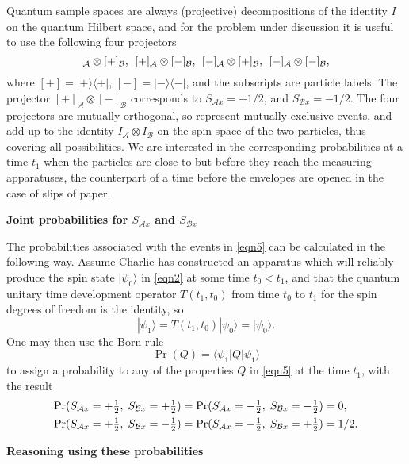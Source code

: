 \documentclass[10pt]{article} %
\def\outl#1{\par{\medskip\noindent\hspace*{.5cm}\bf
      \mathversion{bold}#1\mathversion{normal}\smallskip} }
\def\np{} \def\xa{} \def\xb{} \def\xn{} \def\xp{}
\def\outl#1{} \def\np{} \def\xa{} \def\xb{} \def\xn{} \def\xp{}
\def\outl#1{\par{\medskip\noindent\hspace*{.5cm}\bf
      \mathversion{bold}#1\mathversion{normal}\smallskip} }
\def\np{\newpage }\def\xn{\nopagebreak }\def\xp{\pagebreak }
\newcommand{\dya}[1]{|#1\rgl\lgl#1|}
\newcommand{\hf}{{\textstyle\frac{1}{2} }}
\newcommand{\hquad}{\mspace{8 mu}}
\newcommand{\ket}[1]{|#1\rgl }
\newcommand{\lgl}{\langle }
\newcommand{\mte}[2]{\lgl#1|#2|#1\rgl }
\newcommand{\ot}{\otimes }
\newcommand{\rgl}{\rangle }
\newcommand{\AM}{{\mathcal A}}
\newcommand{\BM}{{\mathcal B}}
\begin{document}
Quantum sample spaces are always (projective) decompositions of the identity
$I$ on the quantum Hilbert space,
and for the problem under discussion it is useful to use the following 
four projectors
\begin{equation}
  [+]_\AM\ot [+]_\BM,\hquad [+]_\AM\ot [-]_\BM,\hquad [-]_\AM\ot [+]_\BM,
\hquad  [-]_\AM\ot [-]_\BM, 
\label{eqn5}
\end{equation}
where $[+] =\dya{+}$, $[-] =\dya{-}$, and the subscripts are particle
labels. The projector $[+]_\AM\ot[-]_\BM$ corresponds to $S_{\AM x}=+1/2$, and
$S_{\BM x}=-1/2$. The four projectors are mutually orthogonal, so represent
mutually exclusive events, and add up to the identity $I_\AM\ot I_\BM$ on the
spin space of the two particles, thus covering all possibilities. We are
interested in the corresponding probabilities at a time $t_1$ when the
particles are close to but before they reach the measuring apparatuses, the
counterpart of a time before the envelopes are opened in the case of slips of
paper.

\xb
\outl{Joint probabilities for $S_{\AM x}$ and $S_{\BM x}$}
\xa



The probabilities associated with the events in \eqref{eqn5} can be calculated
in the following way.  Assume Charlie has constructed an apparatus which will
reliably produce the spin state $\ket{\psi_0}$ in \eqref{eqn2} at some time
$t_0 < t_1$, and that the quantum unitary time development operator
$T(t_1,t_0)$ from time $t_0$ to $t_1$ for the spin degrees of freedom is the
identity, so
\begin{equation}
\ket{\psi_1} = T(t_1,t_0)\ket{\psi_0} = \ket{\psi_0}.  
\label{eqn6}
\end{equation}
One may then use the Born rule
\begin{equation}
  \Pr(Q) = \mte{\psi_1}{Q}
\label{eqn7}
\end{equation}
to assign a probability to any of the properties $Q$ in \eqref{eqn5} at the
time $t_1$, with the result 
\begin{align}
  \Pr(S_{\AM x}&=+\hf,\;S_{\BM x}=+\hf)  = 
 \Pr(S_{\AM x}=-\hf,\;S_{\BM x}=-\hf) = 0,
\notag\\ 
 \Pr(S_{\AM x}&=+\hf,\;S_{\BM x}=-\hf) =
 \Pr(S_{\AM x}=-\hf,\;S_{\BM x}=+\hf)  = 1/2.
\label{eqn8}
\end{align}

\xb
\outl{Reasoning using these probabilities}
\xa
\end{document}
